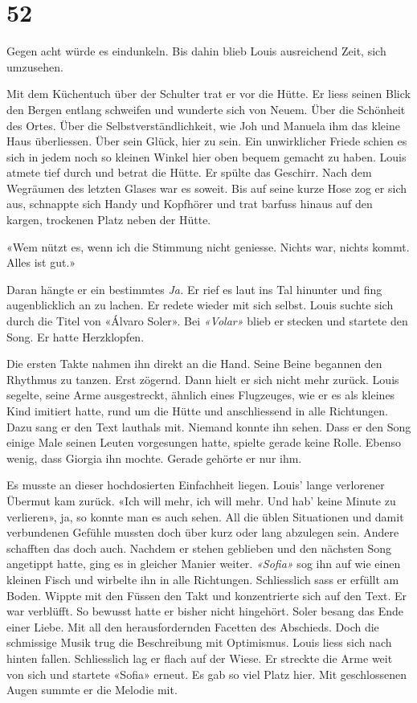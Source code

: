 \chapter{52}



Gegen acht würde es eindunkeln. Bis dahin blieb Louis ausreichend Zeit, sich
umzusehen. 

Mit dem Küchentuch über der Schulter trat er vor die Hütte. Er liess
seinen Blick den Bergen entlang schweifen und wunderte sich von Neuem.
Über die Schönheit des Ortes. Über die Selbstverständlichkeit, wie Joh
und Manuela ihm das kleine Haus überliessen. Über sein Glück, hier zu
sein. Ein unwirklicher Friede schien es sich in jedem noch so kleinen
Winkel hier oben bequem gemacht zu haben.
Louis atmete tief durch und betrat die Hütte. Er spülte das Geschirr.
Nach dem Wegräumen des letzten Glases war es soweit. Bis auf seine kurze
Hose zog er sich aus, schnappte sich Handy und Kopfhörer und trat
barfuss hinaus auf den kargen, trockenen Platz neben
der Hütte.

«Wem nützt es, wenn ich die Stimmung nicht geniesse. Nichts war, nichts
kommt. Alles ist gut.»

Daran hängte er ein bestimmtes \emph{Ja.} Er rief es laut ins Tal
hinunter und fing augenblicklich an zu lachen. Er redete wieder
mit sich selbst.
Louis suchte sich durch die Titel von «Álvaro Soler». Bei
\emph{«Volar»} blieb er stecken und startete den Song. Er hatte
Herzklopfen.

Die ersten Takte nahmen ihn direkt an die Hand. Seine Beine begannen den
Rhythmus zu tanzen. Erst zögernd. Dann hielt er sich
nicht mehr zurück. Louis segelte, seine Arme ausgestreckt, ähnlich eines
Flugzeuges, wie er es als kleines Kind imitiert hatte, rund um die Hütte
und anschliessend in alle Richtungen. Dazu sang er den Text lauthals
mit. Niemand konnte ihn sehen. Dass er den Song einige Male seinen
Leuten vorgesungen hatte, spielte gerade keine Rolle. Ebenso wenig, dass
Giorgia ihn mochte. Gerade gehörte er nur ihm.


Es musste an dieser hochdosierten Einfachheit liegen. Louis’ lange
verlorener Übermut kam zurück. «Ich will mehr, ich will mehr. Und
hab’ keine Minute zu verlieren», ja, so konnte man es
auch sehen. All die üblen Situationen und damit verbundenen Gefühle mussten doch über kurz oder lang abzulegen sein. Andere schafften das doch auch.
Nachdem er stehen geblieben und den nächsten Song angetippt hatte, ging
es in gleicher Manier weiter. \emph{«Sofia»}  sog ihn auf wie einen kleinen Fisch und wirbelte ihn in alle Richtungen. Schliesslich sass er erfüllt am Boden. Wippte mit den Füssen den Takt und konzentrierte sich auf den Text. Er war verblüfft.
So bewusst hatte er bisher nicht hingehört. Soler besang das Ende einer Liebe. Mit all den herausfordernden Facetten des Abschieds. Doch die
schmissige Musik trug die Beschreibung mit Optimismus. Louis liess sich
nach hinten fallen. Schliesslich lag er flach auf der Wiese. Er streckte
die Arme weit von sich und startete «Sofia» erneut.
Es gab so viel Platz hier. Mit geschlossenen Augen summte er die Melodie
mit.

